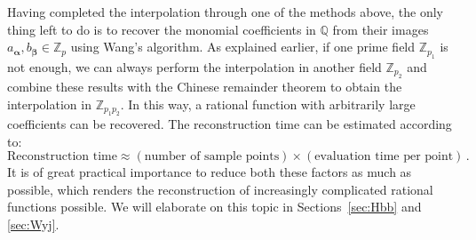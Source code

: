 \documentclass[main.tex]{subfiles}
\begin{document}
Having completed the interpolation through one of the methods above, the only thing left to do is to recover the monomial coefficients in $\mathbb{Q}$ from their images $a_{\bm{\alpha}}, b_{\bm{\beta}} \in \mathbb{Z}_p$ using Wang's algorithm. As explained earlier, if one prime field $\mathbb{Z}_{p_1}$ is not enough, we can always perform the interpolation in another field $\mathbb{Z}_{p_2}$ and combine these results with the Chinese remainder theorem to obtain the interpolation in $\mathbb{Z}_{p_1 p_2}$. In this way, a rational function with arbitrarily large coefficients can be recovered. The reconstruction time can be estimated according to:
\begin{equation} \label{eq:rectimeschematic}
    \text{Reconstruction time} \approx (\text{number of sample points}) \times (\text{evaluation time per point})\,.
\end{equation}
It is of great practical importance to reduce both these factors as much as possible, which renders the reconstruction of increasingly complicated rational functions possible. We will elaborate on this topic in Sections~\ref{sec:Hbb} and \ref{sec:Wyj}.
\end{document}
